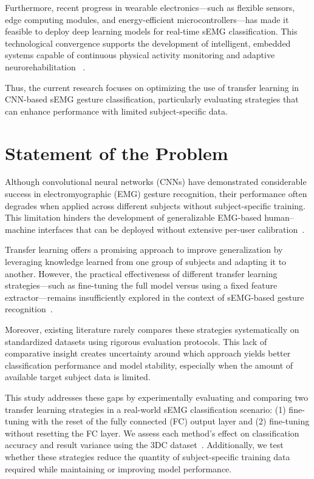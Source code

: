 Furthermore, recent progress in wearable electronics—such as flexible sensors, edge computing modules, and energy-efficient microcontrollers—has made it feasible to deploy deep learning models for real-time sEMG classification. This technological convergence supports the development of intelligent, embedded systems capable of continuous physical activity monitoring and adaptive neurorehabilitation ~\cite{Shen2020}.

Thus, the current research focuses on optimizing the use of transfer learning in CNN-based sEMG gesture classification, particularly evaluating strategies that can enhance performance with limited subject-specific data.

\section{Statement of the Problem}

Although convolutional neural networks (CNNs) have demonstrated considerable success in electromyographic (EMG) gesture recognition, their performance often degrades when applied across different subjects without subject-specific training. This limitation hinders the development of generalizable EMG-based human–machine interfaces that can be deployed without extensive per-user calibration~\cite{Cote2019, Geng2016}.

Transfer learning offers a promising approach to improve generalization by leveraging knowledge learned from one group of subjects and adapting it to another. However, the practical effectiveness of different transfer learning strategies—such as fine-tuning the full model versus using a fixed feature extractor—remains insufficiently explored in the context of sEMG-based gesture recognition~\cite{Lehmler2021}.

Moreover, existing literature rarely compares these strategies systematically on standardized datasets using rigorous evaluation protocols. This lack of comparative insight creates uncertainty around which approach yields better classification performance and model stability, especially when the amount of available target subject data is limited.

This study addresses these gaps by experimentally evaluating and comparing two transfer learning strategies in a real-world sEMG classification scenario: (1) fine-tuning with the reset of the fully connected (FC) output layer and (2) fine-tuning without resetting the FC layer. We assess each method's effect on classification accuracy and result variance using the 3DC dataset~\cite{Cote2019_3DC}. Additionally, we test whether these strategies reduce the quantity of subject-specific training data required while maintaining or improving model performance.

